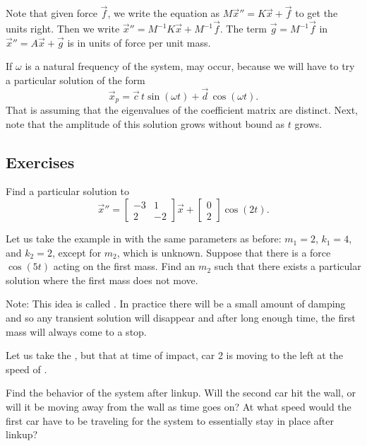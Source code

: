 Note that given force $\vec{f}$, we write 
the equation as $M {\vec{x}}'' = K \vec{x} + \vec{f}$ to get the units
right. Then we write
${\vec{x}}'' = M^{-1}K \vec{x} + M^{-1}\vec{f}$.  The 
term $\vec{g} = M^{-1} \vec{f}$ in ${\vec{x}}'' = A \vec{x} + \vec{g}$ is in units of force
per unit mass.

If $\omega$ is a natural frequency of the system,
\emph{} may occur,
because we will have to try a particular solution of the form
\begin{equation*}
\vec{x}_p =
\vec{c} \, t \sin (\omega t) +
\vec{d} \, \cos (\omega t) .
\end{equation*}
That is assuming that the eigenvalues of the coefficient matrix are distinct.
Next, note that the amplitude of this solution grows without bound as $t$ grows.

\subsection{Exercises}

\begin{exercise}
Find a particular solution to
\begin{equation*}
{\vec{x}}'' =
\begin{bmatrix}
-3 & 1 \\
2 & -2
\end{bmatrix}
\vec{x} 
+ 
\begin{bmatrix}
0 \\ 2
\end{bmatrix}
\cos (2 t) .
\end{equation*}
\end{exercise}

\begin{exercise}[challenging]
Let us take the example in  with
the same parameters as before:
$m_1 = 2$, $k_1 = 4$, and $k_2 = 2$, except for $m_2$, which is unknown.
Suppose that there is a force $\cos (5 t)$ acting on the first mass.
Find an $m_2$ such that there exists a particular solution where the
first mass does not move.

Note: This idea is called \emph{}.
In practice there will be a small amount of
damping and so any transient solution will disappear and after long enough
time, the first mass will always come to a stop.
\end{exercise}

\begin{exercise}
Let us take the , but that at
time of impact, car 2 is moving to the left at the speed of
.
\begin{tasks}
\task
Find the behavior of the system after linkup.
\task
Will the second car hit
the wall, or will it be moving away from the wall as time goes on?
\task
At
what speed would the first car have to be traveling for the system to
essentially stay in place after linkup?
\end{tasks}
\end{exercise}

